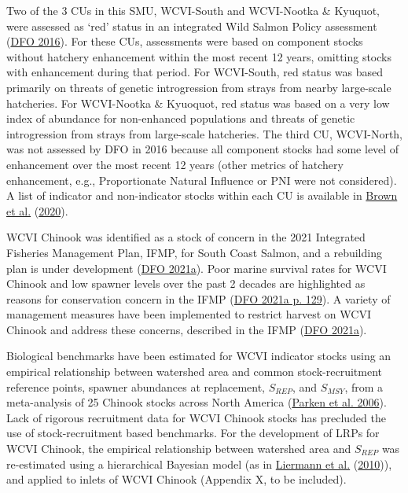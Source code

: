 \documentclass[11pt]{book}
\begin{document}
Two of the 3 CUs in this SMU, WCVI-South and WCVI-Nootka \& Kyuquot, were assessed as `red' status in an integrated Wild Salmon Policy assessment (\protect\hyperlink{ref-dfoIntegratedBiologicalStatus2016}{DFO 2016}). For these CUs, assessments were based on component stocks without hatchery enhancement within the most recent 12 years, omitting stocks with enhancement during that period. For WCVI-South, red status was based primarily on threats of genetic introgression from strays from nearby large-scale hatcheries. For WCVI-Nootka \& Kyuoquot, red status was based on a very low index of abundance for non-enhanced populations and threats of genetic introgression from strays from large-scale hatcheries. The third CU, WCVI-North, was not assessed by DFO in 2016 because all component stocks had some level of enhancement over the most recent 12 years (other metrics of hatchery enhancement, e.g., Proportionate Natural Influence or PNI were not considered). A list of indicator and non-indicator stocks within each CU is available in \protect\hyperlink{ref-brown2020SummaryAbundance2020}{Brown et al.} (\protect\hyperlink{ref-brown2020SummaryAbundance2020}{2020}).

WCVI Chinook was identified as a stock of concern in the 2021 Integrated Fisheries Management Plan, IFMP, for South Coast Salmon, and a rebuilding plan is under development (\protect\hyperlink{ref-dfoIntegratedFisheriesManagement2021}{DFO 2021a}). Poor marine survival rates for WCVI Chinook and low spawner levels over the past 2 decades are highlighted as reasons for conservation concern in the IFMP (\protect\hyperlink{ref-dfoIntegratedFisheriesManagement2021}{DFO 2021a p. 129}). A variety of management measures have been implemented to restrict harvest on WCVI Chinook and address these concerns, described in the IFMP (\protect\hyperlink{ref-dfoIntegratedFisheriesManagement2021}{DFO 2021a}).

Biological benchmarks have been estimated for WCVI indicator stocks using an empirical relationship between watershed area and common stock-recruitment reference points, spawner abundances at replacement, \(S_{REP}\), and \(S_{MSY}\), from a meta-analysis of 25 Chinook stocks across North America (\protect\hyperlink{ref-parkenHabitatbasedMethodsEstimate2006}{Parken et al. 2006}). Lack of rigorous recruitment data for WCVI Chinook stocks has precluded the use of stock-recruitment based benchmarks. For the development of LRPs for WCVI Chinook, the empirical relationship between watershed area and \(S_{REP}\) was re-estimated using a hierarchical Bayesian model (as in \protect\hyperlink{ref-liermannUsingAccessibleWatershed2010}{Liermann et al.} (\protect\hyperlink{ref-liermannUsingAccessibleWatershed2010}{2010})), and applied to inlets of WCVI Chinook (Appendix X, to be included).
\end{document}
